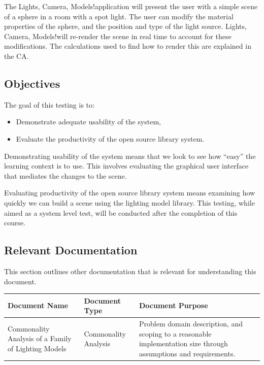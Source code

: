 \documentclass[12pt, titlepage]{article}
\newcommand{\famname}{Lights, Camera, Models!}
\begin{document}
The \famname application will present the user with a simple scene of a sphere 
in a room with a spot light. The user can modify the material properties of the 
sphere, and the position and type of the light source. \famname will re-render 
the scene in real time to account for these modifications. The calculations 
used to find how to render this are explained in the CA. 

\subsection{Objectives}
The goal of this testing is to:

\begin{itemize}
	\item Demonstrate adequate usability of the system,
	\item Evaluate the productivity of the open source library system.
\end{itemize}

Demonstrating usability of the system means that we look to see how ``easy'' 
the learning context is to use. This involves evaluating the graphical user 
interface that mediates the changes to the scene.

Evaluating productivity of the open source library system means examining how 
quickly we can build a scene using the lighting model library. This testing, 
while aimed as a system level test, will be conducted after the completion of 
this course.


\pagebreak
\subsection{Relevant Documentation}
This section outlines other documentation that is relevant for understanding 
this document.
\begin{table}[h]
	\begin{tabular}{|p{3.5cm}|p{3cm}|p{8cm}|}
		\hline
	\textbf{Document Name} & \textbf{Document Type} & \textbf{Document Purpose} 
	 \\
		\hline
		Commonality Analysis of a Family of Lighting Models& Commonality 
		Analysis & Problem domain description, and scoping to a reasonable 
		implementation size through assumptions and requirements. \\ 
		\hline
	\end{tabular}
\end{table}
\end{document}
